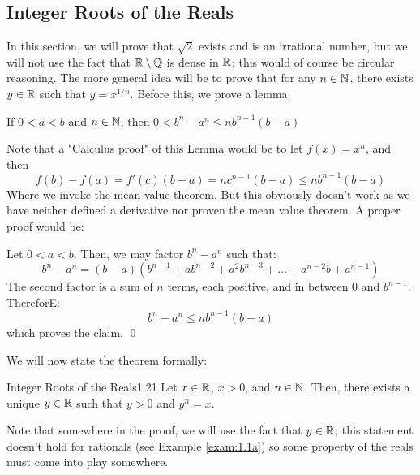 \subsection{Integer Roots of the Reals}
In this section, we will prove that $\sqrt{2}$ exists and is an irrational number, but we will not use the fact that $\mathbb{R} \setminus \mathbb{Q}$ is dense in $\mathbb{R}$; this would of course be circular reasoning. The more general idea will be to prove that for any $n \in \mathbb{N}$, there exists $y \in \mathbb{R}$ such that $y = x^{1/n}$. Before this, we prove a lemma.
\begin{nlemma}{}
    If $0 < a < b$ and $n \in \mathbb{N}$, then $0 < b^n - a^n \leq nb^{n-1}(b-a)$
\end{nlemma}
\noindent Note that a "Calculus proof" of this Lemma would be to let $f(x) = x^n$, and then
\[f(b) - f(a) = f'(c)(b-a) = nc^{n-1}(b-a) \leq nb^{n-1}(b-a)\]
Where we invoke the mean value theorem. But this obviously doesn't work as we have neither defined a derivative nor proven the mean value theorem. A proper proof would be:
\begin{nproof}
    Let $0 < a < b$. Then, we may factor $b^n - a^n$ such that:
    \[b^n - a^n = (b-a)(b^{n-1} + ab^{n-2} + a^2b^{n-3} + \ldots + a^{n-2}b + a^{n-1})\]
    The second factor is a sum of $n$ terms, each positive, and in between $0$ and $b^{n-1}$. ThereforE:
    \[b^n - a^n \leq nb^{n-1}(b-a)\]
    which proves the claim. \qed
\end{nproof}
\noindent We will now state the theorem formally:
\begin{theorem}{Integer Roots of the Reals}{1.21}
    Let $x \in \mathbb{R}$, $x > 0$, and $n \in \mathbb{N}$. Then, there exists a unique $y \in \mathbb{R}$ such that $y > 0$ and $y^n = x$. 
\end{theorem}
\noindent Note that somewhere in the proof, we will use the fact that $y \in \mathbb{R}$; this statement doesn't hold for rationals (see Example \ref{exam:1.1a}) so some property of the reals must come into play somewhere.
